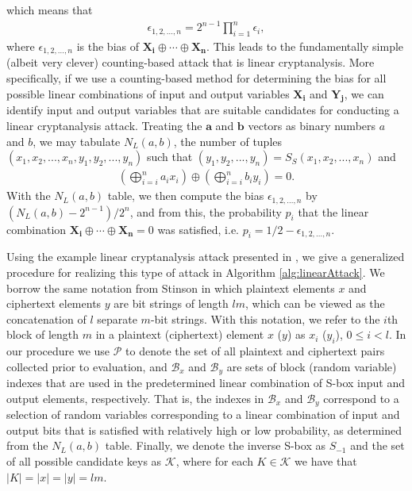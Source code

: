 which means that 
\begin{align*}
\epsilon_{1,2,\dots,n} = 2^{n-1}\prod_{i=1}^{n}\epsilon_i,
\end{align*}
where $\epsilon_{1,2,\dots,n}$ is the bias of $\mathbf{X_i} \oplus \dotsb \oplus \mathbf{X_n}$.
This leads to the fundamentally simple (albeit very clever) counting-based attack that is linear cryptanalysis.
More specifically, if we use a counting-based method for determining the bias for all possible linear
combinations of input and output variables $\mathbf{X_i}$ and $\mathbf{Y_j}$, we can 
identify input and output variables that are suitable candidates for conducting a linear
cryptanalysis attack. Treating the $\mathbf{a}$ and $\mathbf{b}$ vectors as binary numbers $a$ and $b$,
we may tabulate $N_L(a,b)$, the number of tuples
$(x_1,x_2,...,x_n,y_1,y_2,...,y_n)$ such that $(y_1,y_2,...,y_n) = S_S(x_1,x_2,...,x_n)$ and 
\begin{align*}
\left(\bigoplus_{i=i}^{n}a_ix_i\right) \oplus \left(\bigoplus_{i=i}^{n}b_iy_i\right) = 0.
\end{align*}
With the $N_L(a,b)$ table, we then compute the bias $\epsilon_{1,2,\dots,n}$ by $(N_L(a,b) - 2^{n-1}) / 2^n$, 
and from this, the probability $p_i$ that the linear combination $\mathbf{X_i} \oplus \dotsb \oplus \mathbf{X_n} = 0$
was satisfied, i.e. $p_i = 1/2 - \epsilon_{1,2,\dots,n}$. 

Using the example linear cryptanalysis attack presented in \cite{stinson-crypto}, we give a generalized procedure for realizing this type of attack in Algorithm \ref{alg:linearAttack}. We borrow the same notation from Stinson in which plaintext elements $x$ and ciphertext elements $y$ are bit strings of length $lm$, which can be viewed as the concatenation of $l$ separate $m$-bit strings. With this notation, we refer to the $i$th block of length $m$ in a plaintext (ciphertext) element $x$ ($y$) as $x_i$ ($y_i$), $0 \leq i < l$. In our procedure we use $\mathcal{P}$ to denote the set of all plaintext and ciphertext pairs collected prior to evaluation, and $\mathcal{B}_x$ and $\mathcal{B}_y$ are sets of block (random variable) indexes that are used in the predetermined linear combination of S-box input and output elements, respectively. That is, the indexes in $\mathcal{B}_x$ and $\mathcal{B}_y$ correspond to a selection of random variables corresponding to a linear combination of input and output bits that is satisfied with relatively high or low probability, as determined from the $N_L(a,b)$ table. Finally, we denote the inverse S-box as $S_{-1}$ and the set of all possible candidate keys as $\mathcal{K}$, where for each $K \in \mathcal{K}$ we have that $|K| = |x| = |y| = lm$.


